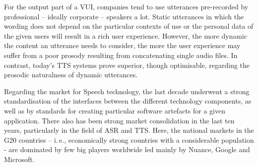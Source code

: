 \begin{multicols}{2}
For the output part of a VUI, companies tend to use utterances pre-recorded by professional – ideally corporate – speakers a lot. Static utterances in which the wording does not depend on the particular contexts of use or the personal data of the given users will result in a rich user experience. However, the more dynamic the content an utterance needs to consider, the more the user experience may suffer from a poor prosody resulting from concatenating single audio files. In contrast, today’s TTS systems prove superior, though optimisable, regarding the prosodic naturalness of dynamic utterances.  

Regarding the market for Speech technology, the last decade underwent a strong standardisation of the interfaces between the different technology components, as well as by standards for creating particular software artefacts for a given application. There also has been strong market consolidation in the last ten years, particularly in the field of ASR and TTS. Here, the national markets in the G20 countries – i.\,e., economically strong countries with a considerable population - are dominated by few big players worldwide led mainly by Nuance, Google and Microsoft. 


\end{multicols}

